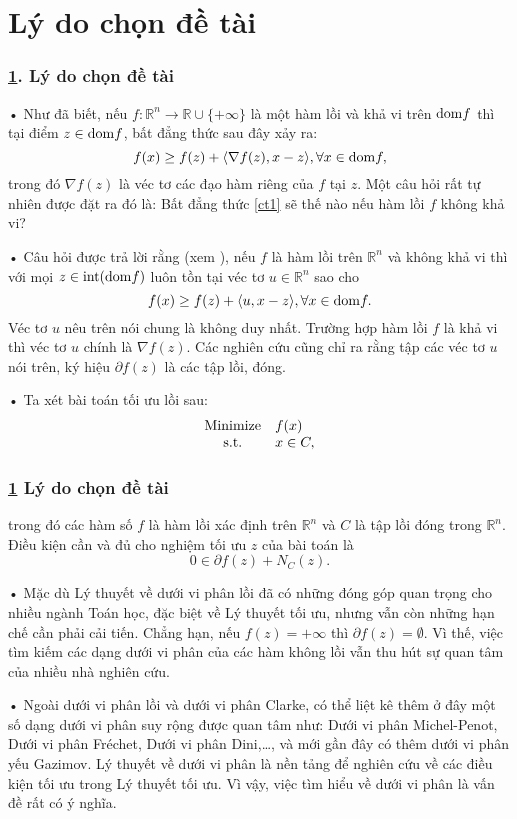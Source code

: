 \documentclass{beamer}
\begin{document}
\section{Lý do chọn đề tài }\label{ld}
\transblindshorizontal 
\frame
{
  \frametitle{\bf \ref{ld}. Lý do chọn đề tài}
• Như đã biết, nếu $f\colon \mathbb{R}^n \to \mathbb{R}\cup \{+\infty\}$ là một hàm lồi và khả vi trên ${\rm dom}f$ thì tại điểm $z \in {\rm dom}f$, bất đẳng thức sau đây xảy ra:
\begin{equation}\label{ct1}
 f(x) \ge f(z) + \langle \nabla f(z), x-z \rangle, \forall x \in {\rm dom}f,
 \end{equation}
 trong đó $\nabla f(z)$ là véc tơ các đạo hàm riêng của $f$ tại $z$. Một câu hỏi rất tự nhiên được đặt ra đó là:  Bất đẳng thức \eqref{ct1} sẽ thế nào nếu hàm lồi $f$ không khả vi? 
 
• Câu hỏi được trả lời rằng (xem \cite[Trang 84]{Ba}), nếu $f$ là hàm lồi trên $\mathbb{R}^n$  và không khả vi thì với mọi $z \in {\rm int(dom}f)$ luôn  tồn tại véc tơ $u \in \mathbb{R}^n$ sao cho 
$$
 f(x) \ge f(z) + \langle u, x-z \rangle, \forall x \in {\rm dom}f.
$$
 Véc tơ $u$ nêu trên nói chung là không duy nhất. Trường hợp hàm lồi $f$ là khả vi thì véc tơ $u$ chính là $\nabla f(z)$. Các nghiên cứu cũng chỉ ra rằng tập các véc tơ $u$ nói trên, ký hiệu $\partial f(z)$ là các tập lồi, đóng.
 
• Ta xét bài toán tối ưu lồi sau:
$$
\begin{array}{cl}
{\rm Minimize}& f(x)\\
{\rm s.t.}&x \in C,
\end{array}
$$
}
\transblindshorizontal 
\frame
{
  \frametitle{\bf \ref{ld} Lý do chọn đề tài}
trong đó các hàm số $f$ là hàm lồi xác định trên $\mathbb{R}^n$ và $C$ là tập lồi đóng trong $\mathbb{R}^n$. 
Điều kiện cần và đủ  cho nghiệm tối ưu $z$ của bài toán là
$$0 \in \partial f(z)+ N_C(z). $$

• Mặc dù Lý thuyết về dưới vi phân lồi đã có những đóng góp quan trọng cho nhiều ngành Toán học, đặc biệt về Lý thuyết tối ưu, nhưng vẫn còn những hạn chế cần phải cải tiến. Chẳng hạn, nếu $f(z)=+\infty$ thì $\partial f(z)=\emptyset.$ Vì thế, việc tìm kiếm các dạng dưới vi phân của các hàm không lồi vẫn thu hút sự quan tâm của nhiều nhà nghiên cứu. 

• Ngoài dưới vi phân lồi và dưới vi phân Clarke, có thể liệt kê thêm ở đây một số dạng dưới vi phân suy rộng được quan tâm như: Dưới vi phân Michel-Penot, Dưới vi phân Fr\'echet, Dưới vi phân Dini,\ldots,  và mới gần đây có thêm dưới vi phân yếu Gazimov. Lý thuyết về dưới vi phân là nền tảng để nghiên cứu về các điều kiện tối ưu trong Lý thuyết tối ưu.  Vì vậy, việc tìm hiểu về dưới vi phân là vấn đề rất có ý nghĩa.
}
\end{document}
